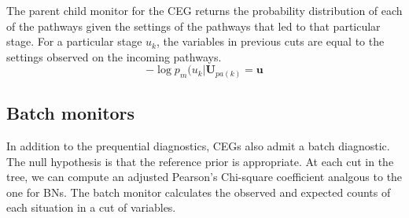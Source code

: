 \documentclass[12pt]{article}
\begin{document}
The parent child monitor for the CEG returns the probability distribution of each of the pathways given the settings of the pathways that led to that particular stage. For a particular stage $u_k$, the variables in previous cuts are equal to the settings observed on the incoming pathways. %
\[
-\log p_m(u_k | \bm{U}_{pa(k)} = \bm{u}
\]
%
%
%
\subsection{Batch monitors}
In addition to the prequential diagnostics, CEGs also admit a batch diagnostic. The null hypothesis is that the reference prior is appropriate. At each cut in the tree, we can compute an adjusted Pearson's Chi-square coefficient analgous to the one for BNs. 
The batch monitor calculates the observed and expected counts of each situation in a cut of variables. 
%
%
%

%
%
%
\end{document}
